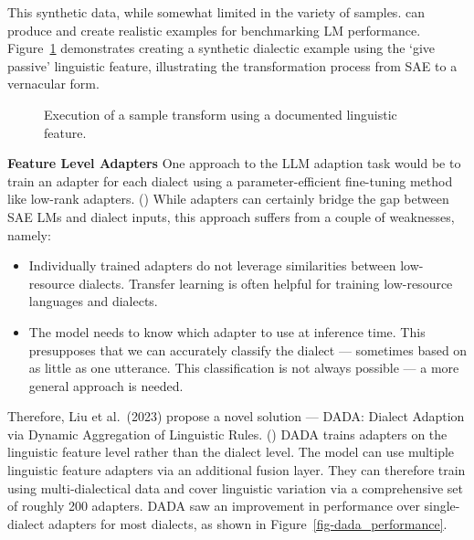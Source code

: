 \documentclass[
  letterpaper,
  numbers=noenddot,
  DIV=11,
  oneside]{scrreprt}
\theoremstyle{remark}
\begin{document}
This synthetic data, while somewhat limited in the variety of samples.
can produce and create realistic examples for benchmarking LM
performance. Figure~\ref{fig-synthetic_example} demonstrates creating a
synthetic dialectic example using the `give passive' linguistic feature,
illustrating the transformation process from SAE to a vernacular form.

\begin{figure}


\caption{\label{fig-synthetic_example}Execution of a sample transform
using a documented linguistic feature.}

\end{figure}%

\textbf{Feature Level Adapters} One approach to the LLM adaption task
would be to train an adapter for each dialect using a
parameter-efficient fine-tuning method like low-rank adapters.
() While adapters can certainly
bridge the gap between SAE LMs and dialect inputs, this approach suffers
from a couple of weaknesses, namely:

\begin{itemize}
\item
  Individually trained adapters do not leverage similarities between
  low-resource dialects. Transfer learning is often helpful for training
  low-resource languages and dialects.
\item
  The model needs to know which adapter to use at inference time. This
  presupposes that we can accurately classify the dialect --- sometimes
  based on as little as one utterance. This classification is not always
  possible --- a more general approach is needed.
\end{itemize}

Therefore, Liu et al.~(2023) propose a novel solution --- DADA: Dialect
Adaption via Dynamic Aggregation of Linguistic Rules.
() DADA trains adapters on
the linguistic feature level rather than the dialect level. The model
can use multiple linguistic feature adapters via an additional fusion
layer. They can therefore train using multi-dialectical data and cover
linguistic variation via a comprehensive set of roughly 200 adapters.
DADA saw an improvement in performance over single-dialect adapters for
most dialects, as shown in Figure~\ref{fig-dada_performance}.
\end{document}
